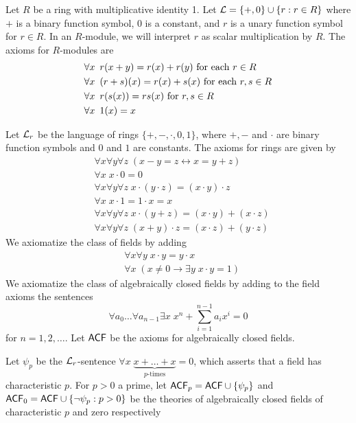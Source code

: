 \documentclass[11pt]{article}
\begin{document}
\begin{examplle}
Let \(R\) be a ring with multiplicative identity 1. Let
\(\mathcal{L}=\{+,0\}\cup\{r:r\in R\}\) where \(+\) is a binary function symbol, 0 is a
constant, and \(r\) is a unary function symbol for \(r\in R\). In an
\(R\)-module, we will interpret \(r\) as scalar multiplication by \(R\). The
axioms for \(R\)-modules are
\begin{align*}
&\forall x\enspace r(x+y)=r(x)+r(y)\text{ for each }r\in R\\
&\forall x\enspace (r+s)(x)=r(x)+s(x)\text{ for each }r,s\in R\\
&\forall x\enspace r(s(x))=rs(x)\text{ for } r,s\in R\\
&\forall x\enspace 1(x)=x
\end{align*}
\end{examplle}
\begin{examplle}
Let \(\mathcal{L}_r\) be the language of rings \(\{+,-,\cdot,0,1\}\), where \(+,-\) and \(\cdot\)
are binary function symbols and \(0\) and \(1\) are constants. The axioms for rings are given 
by
\begin{align*}
&\forall x\forall y\forall z\;(x-y=z\leftrightarrow x=y+z)\\
&\forall x\;x\cdot 0=0\\
&\forall x\forall y\forall z\;x\cdot(y\cdot z)=(x\cdot y)\cdot z\\
&\forall x\;x\cdot 1=1\cdot x=x\\
&\forall x\forall y\forall z\;x\cdot(y+z)=(x\cdot y)+(x\cdot z)\\
&\forall x\forall y\forall z\;(x+y)\cdot z=(x\cdot z)+(y\cdot z)
\end{align*}
We axiomatize the class of fields by adding
\begin{align*}
&\forall x\forall y\;x\cdot y=y\cdot x\\
&\forall x\;(x\neq 0\to\exists y\;x\cdot y=1)
\end{align*}
We axiomatize the class of algebraically closed fields by adding to the field axioms the sentences
\begin{equation*}
\forall a_0\dots\forall a_{n-1}\exists x\;x^n+\displaystyle\sum_{i=1}^{n-1}
a_ix^i=0
\end{equation*}
for \(n=1,2,\dots\). Let \(\textsf{ACF}\) be the axioms for algebraically closed fields.

Let \(\psi_p\) be the \(\mathcal{L}_r\)-sentence
\(\forall x\;\underbrace{x+\dots+x}_{p\text{-times}}=0\), which asserts that a field has characteristic
\(p\). For \(p>0\) a prime, let \(\textsf{ACF}_p=\textsf{ACF}\cup\{\psi_p\}\) and
\(\textsf{ACF}_0=\textsf{ACF}\cup\{\neg\psi_p:p>0\}\) be the theories of algebraically
closed fields of characteristic \(p\) and zero respectively
\end{examplle}
\end{document}
